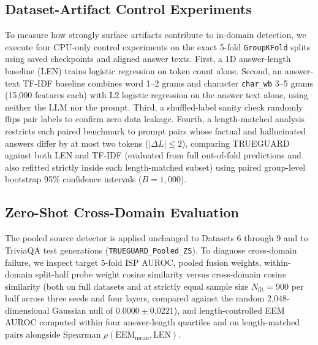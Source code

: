 \documentclass{ieeeaccess}
\begin{document}
\subsection{Dataset-Artifact Control Experiments}
To measure how strongly surface artifacts contribute to in-domain detection, we execute four CPU-only control experiments on the exact 5-fold \texttt{GroupKFold} splits using saved checkpoints and aligned answer texts. First, a 1D answer-length baseline (LEN) trains logistic regression on token count alone. Second, an answer-text TF-IDF baseline combines word 1--2 grams and character \texttt{char\_wb} 3--5 grams (15,000 features each) with L2 logistic regression on the answer text alone, using neither the LLM nor the prompt. Third, a shuffled-label sanity check randomly flips pair labels to confirm zero data leakage. Fourth, a length-matched analysis restricts each paired benchmark to prompt pairs whose factual and hallucinated answers differ by at most two tokens ($|\Delta L| \le 2$), comparing TRUEGUARD against both LEN and TF-IDF (evaluated from full out-of-fold predictions and also refitted strictly inside each length-matched subset) using paired group-level bootstrap 95\% confidence intervals ($B = 1{,}000$).

\subsection{Zero-Shot Cross-Domain Evaluation}
The pooled source detector is applied unchanged to Datasets 6 through 9 and to TriviaQA test generations (\texttt{TRUEGUARD\_Pooled\_ZS}). To diagnose cross-domain failure, we inspect target 5-fold ISP AUROC, pooled fusion weights, within-domain split-half probe weight cosine similarity versus cross-domain cosine similarity (both on full datasets and at strictly equal sample size $N_{\text{fit}} = 900$ per half across three seeds and four layers, compared against the random 2,048-dimensional Gaussian null of $0.0000 \pm 0.0221$), and length-controlled EEM AUROC computed within four answer-length quartiles and on length-matched pairs alongside Spearman $\rho(\text{EEM}_{\text{mean}}, \text{LEN})$.
\end{document}
